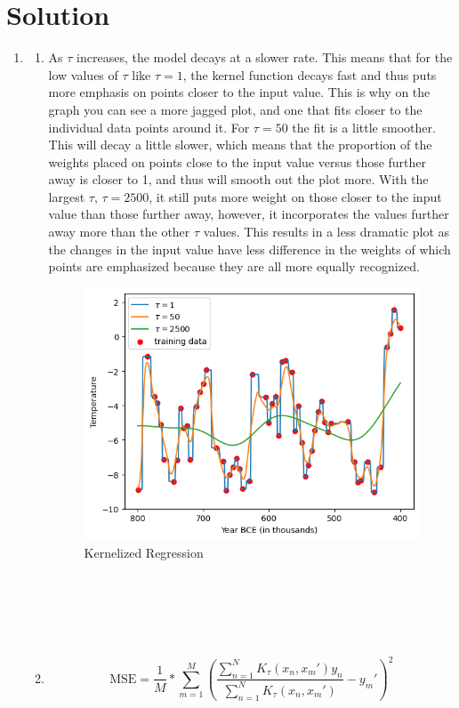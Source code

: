 \documentclass[submit]{harvardml}
\newenvironment{solution}
  {\color{blue}\section*{Solution}}
{}
\begin{document}
\begin{solution}
\begin{enumerate}
    \item 
    \begin{enumerate}
        \item As $\tau$ increases, the model decays at a slower rate. This means that for the low values of $\tau$ like $\tau = 1$, the kernel function decays fast and thus puts more emphasis on points closer to the input value. This is why on the graph you can see a more jagged plot, and one that fits closer to the individual data points around it. For $\tau =50$ the fit is a little smoother. This will decay a little slower, which means that the proportion of the weights placed on points close to the input value versus those further away is closer to 1, and thus will smooth out the plot more. With the largest $\tau$, $\tau = 2500$, it still puts more weight on those closer to the input value than those further away, however, it incorporates the values further away more than the other $\tau$ values. This results in a less dramatic plot as the changes in the input value have less difference in the weights of which points are emphasized because they are all more equally recognized. 
        \begin{figure}[htp]
            \centering
            \includegraphics[width=0.5\linewidth]{img_output/p1.2a.png}
            \caption{Kernelized Regression}
            \label{fig:enter-label}
        \end{figure}
        \\\\\\\\
        \item
        $$\text{MSE} = \frac{1}{M}*\sum_{m=1}^M(\frac{\sum_{n=1}^N K_{\tau}(x_n, x_m')y_n}{\sum_{n=1}^N K_{\tau}(x_n, x_m')} - y_m')^2 $$
        

\end{enumerate}
\end{enumerate}
\end{solution}
\end{document}
